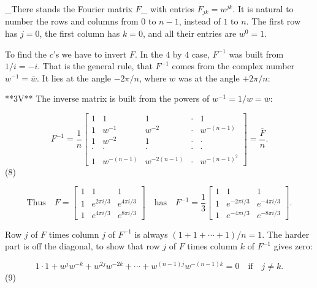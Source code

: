 _There stands the Fourier matrix \(F\)_ with entries \(F_{jk}=w^{jk}\). It is natural to number the rows and columns from \(0\) to \(n-1\), instead of \(1\) to \(n\). The first row has \(j=0\), the first column has \(k=0\), and all their entries are \(w^{0}=1\).

To find the \(c\)'s we have to invert \(F\). In the \(4\) by \(4\) case, \(F^{-1}\) was built from \(1/i=-i\). That is the general rule, that \(F^{-1}\) comes from the complex number \(w^{-1}=\overline{w}\). It lies at the angle \(-2\pi/n\), where \(w\) was at the angle \(+2\pi/n\):

**3V** The inverse matrix is built from the powers of \(w^{-1}=1/w=\overline{w}\):

\[F^{-1}=\frac{1}{n}\begin{bmatrix}1&1&1&\cdot&1\\ 1&w^{-1}&w^{-2}&\cdot&w^{-(n-1)}\\ 1&w^{-2}&1&\cdot&\cdot\\ \cdot&\cdot&\cdot&\cdot&\cdot\\ 1&w^{-(n-1)}&w^{-2(n-1)}&\cdot&w^{-(n-1)^{2}}\end{bmatrix}=\frac{\overline{ F}}{n}.\] (8)

\[\text{Thus}\quad F=\begin{bmatrix}1&1&1\\ 1&e^{2\pi i/3}&e^{4\pi i/3}\\ 1&e^{4\pi i/3}&e^{8\pi i/3}\end{bmatrix}\quad\text{has}\quad F^{-1}=\frac{1} {3}\begin{bmatrix}1&1&1\\ 1&e^{-2\pi i/3}&e^{-4\pi i/3}\\ 1&e^{-4\pi i/3}&e^{-8\pi i/3}\end{bmatrix}.\]

Row \(j\) of \(F\) times column \(j\) of \(F^{-1}\) is always \((1+1+\cdots+1)/n=1\). The harder part is off the diagonal, to show that row \(j\) of \(F\) times column \(k\) of \(F^{-1}\) gives zero:

\[1\cdot 1+w^{j}w^{-k}+w^{2j}w^{-2k}+\cdots+w^{(n-1)j}w^{-(n-1)k}=0\quad\text{if} \quad j\neq k.\] (9) 